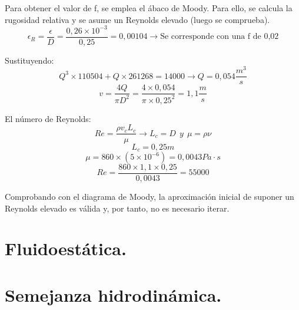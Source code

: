 \begin{enumerate}
	
	Para obtener el valor de f, se emplea el ábaco de Moody. Para ello, se calcula la rugosidad relativa y se asume un Reynolds elevado (luego se comprueba).
	\[\epsilon_R=\dfrac{\epsilon}{D}=\dfrac{0,26\times10^{-3}}{0,25}=0,00104 \rightarrow \text{Se corresponde con una f de 0,02}\]
	
	
	Sustituyendo:
	\[Q^3\times 110504 + Q\times 261268=14000\rightarrow Q=0,054 \dfrac{m^3}{s}\]
	\[v=\dfrac{4Q }{\pi D^2}=\dfrac{4\times 0,054}{\pi \times 0,25^2}=1,1 \dfrac{m}{s}\]
	
	El número de Reynolds:
	\[Re=\dfrac{\rho v_c L_c}{\mu} \rightarrow L_c = D \ \ y \ \ \mu= \rho \nu\]
	\[L_c=0,25 m\]
	\[\mu = 860\times (5\times 10^{-6})=0,0043 Pa \cdot s\]
	\[Re=\dfrac{860 \times 1,1 \times 0,25}{0,0043}=55000\]


	Comprobando con el diagrama de Moody, la aproximación inicial de suponer un Reynolds elevado es válida y, por tanto, no es necesario iterar.
\end{enumerate}
\black
\newpage
\section{Fluidoestática.}
\section{Semejanza hidrodinámica.}